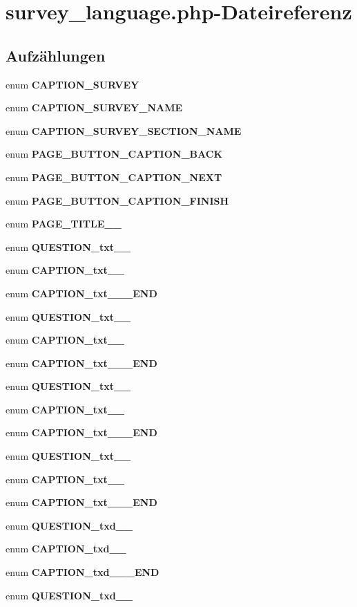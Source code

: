 \section{survey\_\-language.php-Dateireferenz}
\label{iso__9241__10_2language_2dei_2survey__language_8php}
\subsection*{Aufzählungen}
\begin{CompactItemize}
\item 
enum {\bf CAPTION\_\-SURVEY} 
\item 
enum {\bf CAPTION\_\-SURVEY\_\-NAME} 
\item 
enum {\bf CAPTION\_\-SURVEY\_\-SECTION\_\-NAME} 
\item 
enum {\bf PAGE\_\-BUTTON\_\-CAPTION\_\-BACK} 
\item 
enum {\bf PAGE\_\-BUTTON\_\-CAPTION\_\-NEXT} 
\item 
enum {\bf PAGE\_\-BUTTON\_\-CAPTION\_\-FINISH} 
\item 
enum {\bf PAGE\_\-TITLE\_\_\-} 
\item 
enum {\bf QUESTION\_\-txt\_\_\-} 
\item 
enum {\bf CAPTION\_\-txt\_\_\-} 
\item 
enum {\bf CAPTION\_\-txt\_\_\-\_\-END} 
\item 
enum {\bf QUESTION\_\-txt\_\_\-} 
\item 
enum {\bf CAPTION\_\-txt\_\_\-} 
\item 
enum {\bf CAPTION\_\-txt\_\_\-\_\-END} 
\item 
enum {\bf QUESTION\_\-txt\_\_\-} 
\item 
enum {\bf CAPTION\_\-txt\_\_\-} 
\item 
enum {\bf CAPTION\_\-txt\_\_\-\_\-END} 
\item 
enum {\bf QUESTION\_\-txt\_\_\-} 
\item 
enum {\bf CAPTION\_\-txt\_\_\-} 
\item 
enum {\bf CAPTION\_\-txt\_\_\-\_\-END} 
\item 
enum {\bf QUESTION\_\-txd\_\_\-} 
\item 
enum {\bf CAPTION\_\-txd\_\_\-} 
\item 
enum {\bf CAPTION\_\-txd\_\_\-\_\-END} 
\item 
enum {\bf QUESTION\_\-txd\_\_\-} 
\item 

\end{CompactItemize}
